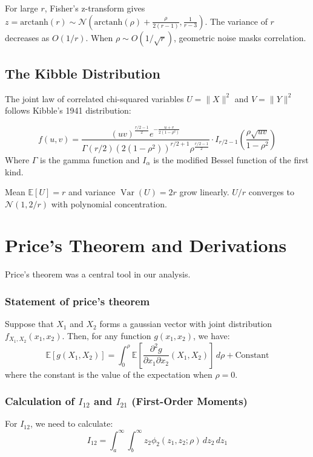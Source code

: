 \documentclass[a4paper]{article}
\newcommand{\E}{\mathbb{E}}
\DeclareMathOperator{\Var}{Var}
\newcommand{\dd}{\,d}
\begin{document}
For large $r$, Fisher's z-transform gives $z = \text{arctanh}(r) \sim \mathcal{N}\left(\text{arctanh}(\rho) + \frac{\rho}{2(r-1)}, \frac{1}{r-3}\right)$. The variance of $r$ decreases as $O(1/r)$. When $\rho \sim O(1/\sqrt{r})$, geometric noise masks correlation.

\subsection{The Kibble Distribution}
The joint law of correlated chi-squared variables $U=\|X\|^2$ and $V=\|Y\|^2$ follows Kibble's 1941 distribution:

\[
f(u, v) = \frac{(uv)^{\frac{r/2-1}{2}} e^{-\frac{u+v}{2(1-\rho^2)}}}{\Gamma(r/2) (2(1-\rho^2))^{r/2+1} \rho^{\frac{r/2-1}{2}}} \cdot I_{r/2-1}\left(\frac{\rho\sqrt{uv}}{1-\rho^2}\right)
\]
Where $\Gamma$ is the gamma function and $I_\alpha$ is the modified Bessel function of the first kind.

Mean $\E[U] = r$ and variance $\Var(U) = 2r$ grow linearly. $U/r$ converges to $\mathcal{N}(1, 2/r)$ with polynomial concentration.



\section{Price's Theorem and Derivations}
Price's theorem was a central tool in our analysis.

\subsubsection*{Statement of price's theorem}
Suppose that $X_1$ and $X_2$ forms a gaussian vector with joint distribution $f_{X_1,X_2}(x_1,x_2)$. Then, for any function $g(x_1,x_2)$, we have:
\[
\E[g(X_1,X_2)] = \int_0^\rho \E\left[\frac{\partial^2 g}{\partial x_1 \partial x_2}(X_1,X_2)\right] \dd\rho + \text{Constant}
\]
where the constant is the value of the expectation when $\rho=0$.





\subsubsection*{Calculation of $I_{12}$ and $I_{21}$ (First-Order Moments)}

For $I_{12}$, we need to calculate:
\[
I_{12} = \int_a^\infty \int_b^\infty z_2 \phi_2(z_1, z_2; \rho) \dd z_2 \dd z_1
\]
\end{document}
